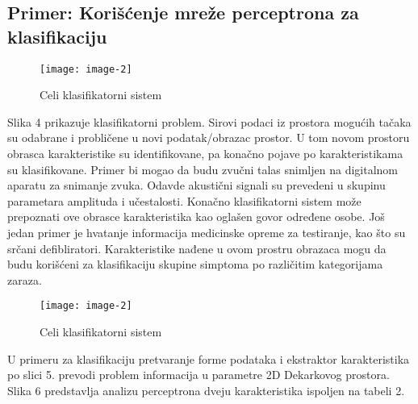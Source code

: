 \documentclass[fontsize=11bp, paper=a4]{scrarticle}
\begin{document}
\subsection{Primer: Korišćenje mreže perceptrona za klasifikaciju}

\begin{figure}[h]
    \centering
    \texttt{[image: image-2]}
    \caption{Celi klasifikatorni sistem}
\end{figure}

Slika 4 prikazuje klasifikatorni problem. Sirovi podaci iz prostora mogućih tačaka su odabrane i probličene u novi podatak/obrazac prostor. U tom novom prostoru obrasca karakteristike su identifikovane, pa konačno pojave po karakteristikama su klasifikovane. Primer bi mogao da budu zvučni talas snimljen na digitalnom aparatu za snimanje zvuka. Odavde akustični signali su prevedeni u skupinu parametara amplituda i učestalosti. Konačno klasifikatorni sistem može prepoznati ove obrasce karakteristika kao oglašen govor određene osobe. Još jedan primer je hvatanje informacija medicinske opreme za testiranje, kao što su srčani defibliratori. Karakteristike nađene u ovom prostru obrazaca mogu da budu korišćeni za klasifikaciju skupine simptoma po različitim kategorijama zaraza.

\begin{figure}[h]
    \centering
    \texttt{[image: image-2]}
    \caption{Celi klasifikatorni sistem}
\end{figure}

U primeru za klasifikaciju pretvaranje forme podataka i ekstraktor karakteristika po slici 5. prevodi problem informacija u parametre 2D Dekarkovog prostora. Slika 6 predstavlja analizu perceptrona dveju karakteristika ispoljen na tabeli 2.
\end{document}
